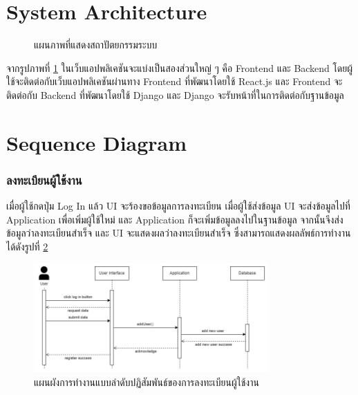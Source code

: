 \documentclass[12pt,oneside,openright,a4paper]{cpe-thai-project}
\begin{document}
\pagebreak
\section{System Architecture}

\begin{figure}[!h]\centering
	\caption{แผนภาพที่แสดงสถาปัตยกรรมระบบ}\label{fig:SystemArchitecture}
\end{figure}

\hspace{1cm}
จากรูปภาพที่ \ref{fig:SystemArchitecture} ในเว็บแอปพลิเคชันจะแบ่งเป็นสองส่วนใหญ่ ๆ คือ Frontend และ Backend โดยผู้ใช้จะติดต่อกับเว็บแอปพลิเคชันผ่านทาง
Frontend ที่พัฒนาโดยใช้ React.js และ Frontend จะติดต่อกับ Backend ที่พัฒนาโดยใช้ Django และ Django
จะรับหน้าที่ในการติดต่อกับฐานข้อมูล

\pagebreak
\section{Sequence Diagram}

\subsubsection{ลงทะเบียนผู้ใช้งาน}
\hspace{1cm}
เมื่อผู้ใช้กดปุ่ม Log In แล้ว UI จะร้องขอข้อมูลการลงทะเบียน เมื่อผู้ใช้ส่งข้อมูล UI จะส่งข้อมูลไปที่ Application
เพื่อเพิ่มผู้ใช้ใหม่ และ Application ก็จะเพิ่มข้อมูลลงไปในฐานข้อมูล จากนั้นจึงส่งข้อมูลว่าลงทะเบียนสำเร็จ
และ UI จะแสดงผลว่าลงทะเบียนสำเร็จ ซึ่งสามารถแสดงผลลัพธ์การทำงานได้ดังรูปที่ \ref{fig:S_Register}
\begin{figure}[!h]\centering
	\includegraphics[width=0.8\textwidth, keepaspectratio=true]{image/chap3/sequence/Register.jpg}
	\caption{แผนผังการทำงานแบบลำดับปฏิสัมพันธ์ของการลงทะเบียนผู้ใช้งาน}\label{fig:S_Register}
\end{figure}
\end{document}
